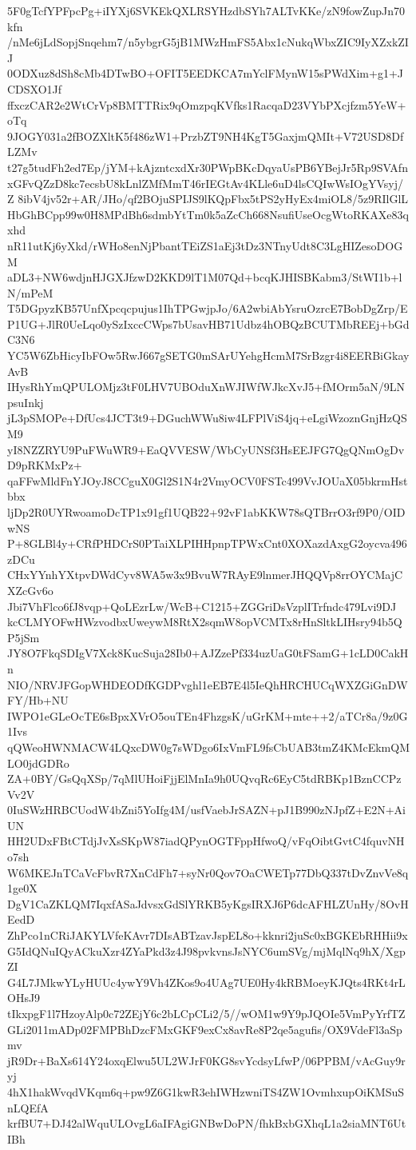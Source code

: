 5F0gTcfYPFpcPg+iIYXj6SVKEkQXLRSYHzdbSYh7ALTvKKe/zN9fowZupJn70kfn
/nMe6jLdSopjSnqehm7/n5ybgrG5jB1MWzHmFS5Abx1cNukqWbxZIC9IyXZxkZIJ
0ODXuz8dSh8cMb4DTwBO+OFIT5EEDKCA7mYclFMynW15sPWdXim+g1+JCDSXO1Jf
ffxczCAR2e2WtCrVp8BMTTRix9qOmzpqKVfks1RacqaD23VYbPXcjfzm5YeW+oTq
9JOGY031a2fBOZXltK5f486zW1+PrzbZT9NH4KgT5GaxjmQMIt+V72USD8DfLZMv
t27g5tudFh2ed7Ep/jYM+kAjzntcxdXr30PWpBKcDqyaUsPB6YBejJr5Rp9SVAfn
xGFvQZzD8kc7ecsbU8kLnlZMfMmT46rIEGtAv4KLle6uD4lsCQIwWsIOgYVsyj/Z
8ibV4jv52r+AR/JHo/qf2BOjuSPIJS9lKQpFbx5tPS2yHyEx4miOL8/5z9RIlGlL
HbGhBCpp99w0H8MPdBh6sdmbYtTm0k5aZcCh668NsufiUseOcgWtoRKAXe83qxhd
nR11utKj6yXkd/rWHo8enNjPbantTEiZS1aEj3tDz3NTnyUdt8C3LgHIZesoDOGM
aDL3+NW6wdjnHJGXJfzwD2KKD9lT1M07Qd+bcqKJHISBKabm3/StWI1b+lN/mPeM
T5DGpyzKB57UnfXpcqcpujus1IhTPGwjpJo/6A2wbiAbYsruOzrcE7BobDgZrp/E
P1UG+JlR0UeLqo0ySzIxccCWps7bUsavHB71Udbz4hOBQzBCUTMbREEj+bGdC3N6
YC5W6ZbHicyIbFOw5RwJ667gSETG0mSArUYehgHcmM7SrBzgr4i8EERBiGkayAvB
IHysRhYmQPULOMjz3tF0LHV7UBOduXnWJIWfWJkcXvJ5+fMOrm5aN/9LNpsuInkj
jL3pSMOPe+DfUcs4JCT3t9+DGuchWWu8iw4LFPlViS4jq+eLgiWzoznGnjHzQSM9
yI8NZZRYU9PuFWuWR9+EaQVVESW/WbCyUNSf3HsEEJFG7QgQNmOgDvD9pRKMxPz+
qaFFwMldFnYJOyJ8CCguX0Gl2S1N4r2VmyOCV0FSTc499VvJOUaX05bkrmHstbbx
ljDp2R0UYRwoamoDcTP1x91gf1UQB22+92vF1abKKW78sQTBrrO3rf9P0/OIDwNS
P+8GLBl4y+CRfPHDCrS0PTaiXLPIHHpnpTPWxCnt0XOXazdAxgG2oycva496zDCu
CHxYYnhYXtpvDWdCyv8WA5w3x9BvuW7RAyE9lnmerJHQQVp8rrOYCMajCXZcGv6o
Jbi7VhFlco6fJ8vqp+QoLEzrLw/WcB+C1215+ZGGriDsVzplITrfndc479Lvi9DJ
kcCLMYOFwHWzvodbxUweywM8RtX2sqmW8opVCMTx8rHnSltkLIHsry94b5QP5jSm
JY8O7FkqSDIgV7Xck8KucSuja28Ib0+AJZzePf334uzUaG0tFSamG+1cLD0CakHn
NIO/NRVJFGopWHDEODfKGDPvghl1eEB7E4l5IeQhHRCHUCqWXZGiGnDWFY/Hb+NU
IWPO1eGLeOcTE6sBpxXVrO5ouTEn4FhzgsK/uGrKM+mte++2/aTCr8a/9z0G1Ivs
qQWeoHWNMACW4LQxcDW0g7sWDgo6IxVmFL9fsCbUAB3tmZ4KMcEkmQMLO0jdGDRo
ZA+0BY/GsQqXSp/7qMlUHoiFjjElMnIa9h0UQvqRc6EyC5tdRBKp1BznCCPzVv2V
0IuSWzHRBCUodW4bZni5YoIfg4M/usfVaebJrSAZN+pJ1B990zNJpfZ+E2N+AiUN
HH2UDxFBtCTdjJvXsSKpW87iadQPynOGTFppHfwoQ/vFqOibtGvtC4fquvNHo7sh
W6MKEJnTCaVcFbvR7XnCdFh7+syNr0Qov7OaCWETp77DbQ337tDvZnvVe8q1ge0X
DgV1CaZKLQM7IqxfASaJdvsxGdSlYRKB5yKgsIRXJ6P6dcAFHLZUnHy/8OvHEedD
ZhPco1nCRiJAKYLVfeKAvr7DIsABTzavJspEL8o+kknri2juSc0xBGKEbRHHii9x
G5IdQNuIQyACkuXzr4ZYaPkd3z4J98pvkvnsJsNYC6umSVg/mjMqlNq9hX/XgpZI
G4L7JMkwYLyHUUc4ywY9Vh4ZKos9o4UAg7UE0Hy4kRBMoeyKJQts4RKt4rLOHsJ9
tIkxpgF1l7HzoyAlp0c72ZEjY6c2bLCpCLi2/5//wOM1w9Y9pJQOIe5VmPyYrfTZ
GLi2011mADp02FMPBhDzcFMxGKF9exCx8avRe8P2qe5agufis/OX9VdeFl3aSpmv
jR9Dr+BaXs614Y24oxqElwu5UL2WJrF0KG8svYcdsyLfwP/06PPBM/vAcGuy9ryj
4hX1hakWvqdVKqm6q+pw9Z6G1kwR3ehIWHzwniTS4ZW1OvmhxupOiKMSuSnLQEfA
krfBU7+DJ42alWquULOvgL6aIFAgiGNBwDoPN/fhkBxbGXhqL1a2siaMNT6UtIBh
